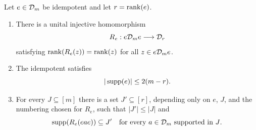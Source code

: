 \begin{lemma}
\label{lem:corners}
Let $e\in\mathcal D_{m}$ be idempotent and let $r=\operatorname{rank}(e)$.
\begin{enumerate}[label=(\roman*)]
  \item There is a unital injective homomorphism
  \[
    R_e:e\mathcal D_{m}e\longrightarrow\mathcal D_{r}
  \]
  satisfying $\operatorname{rank}(R_e(z))=\operatorname{rank}(z)$ for all $z\in e\mathcal D_{m}e$.
  \item The idempotent satisfies
  \[
    |\operatorname{supp}(e)|\leq 2(m-r).
  \]
  \item For every $J\subseteq[m]$ there is a set $J'\subseteq[r]$,
  depending only on $e$, $J$, and the numbering chosen for $R_e$, such
  that $|J'|\leq |J|$ and
  \[
    \operatorname{supp}(R_e(eae))\subseteq J'
    \quad\text{for every $a\in\mathcal D_{m}$ supported in $J$}.
  \]
\end{enumerate}
\end{lemma}

